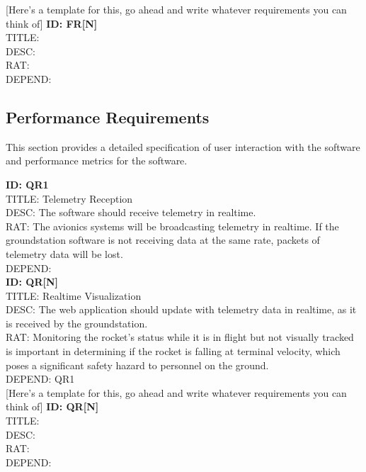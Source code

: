 \documentclass[onecolumn, draftclsnofoot,10pt, compsoc]{IEEEtran}
\begin{document}
			[Here's a template for this, go ahead and write whatever requirements you can think of]
			\noindent
			\textbf{ID: FR[N]}\\
			TITLE: \\
			DESC: \\
			RAT: \\
			DEPEND: \\
		
		\subsection{Performance Requirements}
			This section provides a detailed specification of user interaction with the software and performance metrics for the software.
		
			\noindent
			\textbf{ID: QR1}\\
			TITLE: Telemetry Reception\\
			DESC: The software should receive telemetry in realtime.\\
			RAT: The avionics systems will be broadcasting telemetry in realtime. 
				If the groundstation software is not receiving data at the same rate, packets of telemetry data will be lost.\\
			DEPEND: \\
			
			\noindent
			\textbf{ID: QR[N]}\\
			TITLE: Realtime Visualization\\
			DESC: The web application should update with telemetry data in realtime, as it is received by the groundstation.\\
			RAT: Monitoring the rocket's status while it is in flight but not visually tracked is important in determining if the rocket is falling at terminal velocity, which poses a significant safety hazard to personnel on the ground. \\
			DEPEND: QR1\\

			[Here's a template for this, go ahead and write whatever requirements you can think of]
			\noindent
			\textbf{ID: QR[N]}\\
			TITLE: \\
			DESC: \\
			RAT: \\
			DEPEND: \\
\end{document}
